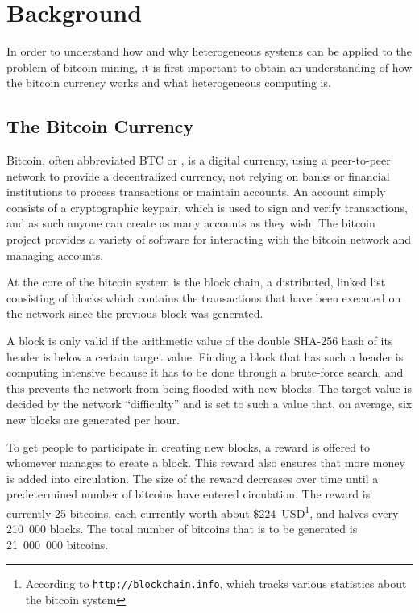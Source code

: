 \chapter{Background}
\label{cha:background}

In order to understand how and why heterogeneous systems can be applied to the problem of
bitcoin mining, it is first important to obtain an understanding of how the bitcoin currency
works and what heterogeneous computing is.

\section{The Bitcoin Currency}
\label{sec:bitcoins}
Bitcoin, often abbreviated BTC or \bitcoin, is a digital currency, using a peer-to-peer network to provide
a decentralized currency, not relying on banks or financial institutions to process transactions
or maintain accounts. An account simply consists of a cryptographic keypair, which is used to sign
and verify transactions, and as such anyone can create as many accounts as they wish. The bitcoin
project provides a variety of software for interacting with the bitcoin network and managing
accounts.

At the core of the bitcoin system is the block chain, a distributed, linked list consisting of blocks
which contains the transactions that have been executed on the network since the previous block was
generated.

A block is only valid if the arithmetic value of the double SHA-256 hash of its header is below
a certain target value. Finding a block that has such a header is computing intensive because it
has to be done through a brute-force search, and this prevents the network from being flooded with
new blocks. The target value is decided by the network ``difficulty'' and is set to such a value
that, on average, six new blocks are generated per hour.


To get people to participate in creating new blocks, a reward is offered to whomever manages to
create a block. This reward also ensures that more money is added into circulation. The size of
the reward decreases over time until a predetermined number of bitcoins have entered circulation.
The reward is currently 25 bitcoins, each currently worth about \$224~USD\footnote{According to \texttt{http://blockchain.info}, which tracks various statistics about the bitcoin system},
and halves every 210~000 blocks. The total number of bitcoins that is to be generated is 21~000~000 bitcoins. \cite{bitcoin}

